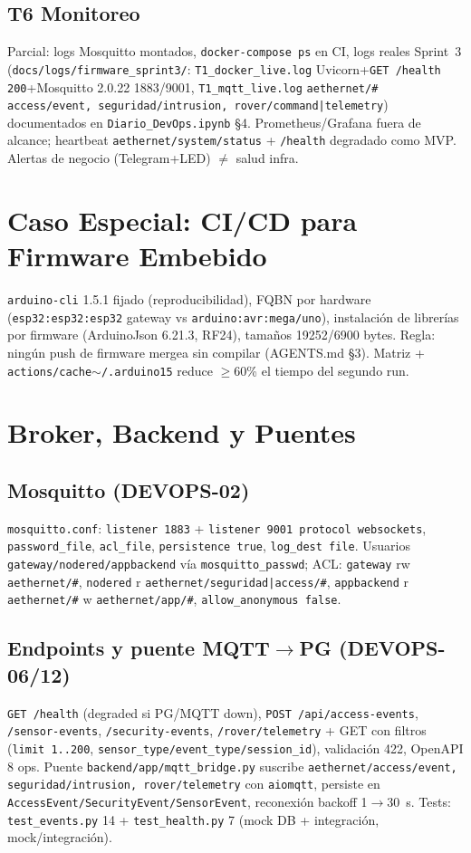 \documentclass[conference]{IEEEtran}
\begin{document}
\subsection{T6 Monitoreo}
Parcial: logs Mosquitto montados, \texttt{docker-compose ps} en CI, logs reales Sprint~3 (\texttt{docs/logs/firmware\_sprint3/}: \texttt{T1\_docker\_live.log} Uvicorn+\texttt{GET /health 200}+Mosquitto 2.0.22 1883/9001, \texttt{T1\_mqtt\_live.log} \texttt{aethernet/\#} \texttt{access/event, seguridad/intrusion, rover/command|telemetry}) documentados en \texttt{Diario\_DevOps.ipynb} \S4. Prometheus/Grafana fuera de alcance; heartbeat \texttt{aethernet/system/status} + \texttt{/health} degradado como MVP. Alertas de negocio (Telegram+LED) $\neq$ salud infra.

\section{Caso Especial: CI/CD para Firmware Embebido}
\texttt{arduino-cli} 1.5.1 fijado (reproducibilidad), FQBN por hardware (\texttt{esp32:esp32:esp32} gateway vs \texttt{arduino:avr:mega/uno}), instalación de librerías por firmware (ArduinoJson 6.21.3, RF24), tamaños 19252/6900 bytes. Regla: ningún push de firmware mergea sin compilar (AGENTS.md \S3). Matriz + \texttt{actions/cache$\sim$/.arduino15} reduce $\geq$60\% el tiempo del segundo run.

\section{Broker, Backend y Puentes}
\subsection{Mosquitto (DEVOPS-02)}
\texttt{mosquitto.conf}: \texttt{listener 1883} + \texttt{listener 9001 protocol websockets}, \texttt{password\_file}, \texttt{acl\_file}, \texttt{persistence true}, \texttt{log\_dest file}. Usuarios \texttt{gateway/nodered/appbackend} vía \texttt{mosquitto\_passwd}; ACL: \texttt{gateway} rw \texttt{aethernet/\#}, \texttt{nodered} r \texttt{aethernet/seguridad|access/\#}, \texttt{appbackend} r \texttt{aethernet/\#} w \texttt{aethernet/app/\#}, \texttt{allow\_anonymous false}.

\subsection{Endpoints y puente MQTT$\rightarrow$PG (DEVOPS-06/12)}
\texttt{GET /health} (degraded si PG/MQTT down), \texttt{POST /api/access-events}, \texttt{/sensor-events}, \texttt{/security-events}, \texttt{/rover/telemetry} + GET con filtros (\texttt{limit 1..200}, \texttt{sensor\_type/event\_type/session\_id}), validación 422, OpenAPI 8 ops. Puente \texttt{backend/app/mqtt\_bridge.py} suscribe \texttt{aethernet/access/event, seguridad/intrusion, rover/telemetry} con \texttt{aiomqtt}, persiste en \texttt{AccessEvent/SecurityEvent/SensorEvent}, reconexión backoff 1$\rightarrow$30~s. Tests: \texttt{test\_events.py} 14 + \texttt{test\_health.py} 7 (mock DB + integración, mock/integración).
\end{document}
